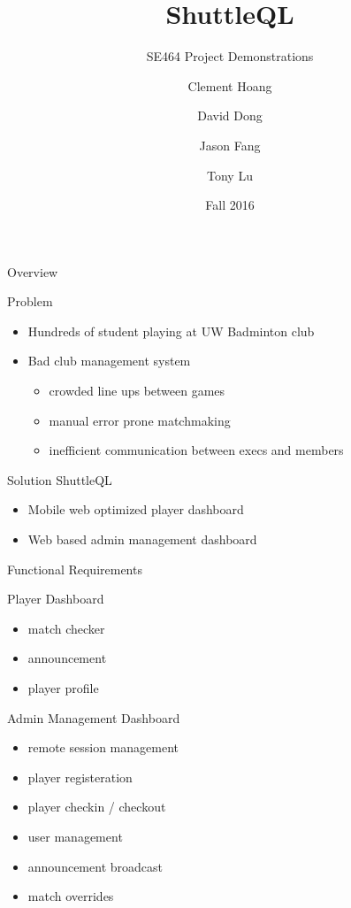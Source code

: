 \documentclass{beamer}
\title{ShuttleQL}
\subtitle{SE464 Project Demonstrations}
\author{Clement Hoang \and David Dong \and Jason Fang \and Tony Lu}
\institute{University of Waterloo}
\date{Fall 2016}
\begin{document}
\begin{frame}
  \titlepage
\end{frame}

\begin{frame}
\Huge Overview
\end{frame}

\begin{frame}{Problem}
  \begin{itemize}
    \item Hundreds of student playing at UW Badminton club
    \item Bad club management system
      \begin{itemize}
        \item crowded line ups between games
        \item manual error prone matchmaking
        \item inefficient communication between execs and members
      \end{itemize}
  \end{itemize}
\end{frame}

\begin{frame}{Solution}
ShuttleQL
\begin{itemize}
  \item Mobile web optimized player dashboard
  \item Web based admin management dashboard
\end{itemize}
\end{frame}

\begin{frame}
\Huge Functional Requirements
\end{frame}

\begin{frame}{Player Dashboard}
\begin{itemize}
\item match checker
\item announcement
\item player profile
\end{itemize}
\end{frame}

\begin{frame}{Admin Management Dashboard}
\begin{itemize}
\item remote session management
\item player registeration
\item player checkin / checkout
\item user management
\item announcement broadcast
\item match overrides
\end{itemize}
\end{frame}
\end{document}
